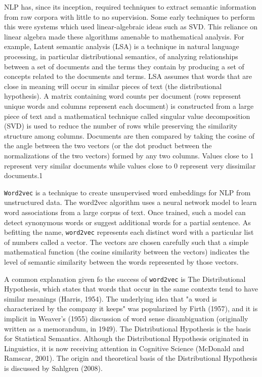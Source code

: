\documentclass[11pt]{book}
\begin{document}
NLP has, since its inception, required techniques to extract semantic information from raw corpora with little to no supervision. Some early techniques to perform this were systems which used linear-algebraic ideas such as SVD. This reliance on linear algebra made these algorithms amenable to mathematical analysis. For example, 
Latent semantic analysis (LSA) is a technique in natural language processing, in particular distributional semantics, of analyzing relationships between a set of documents and the terms they contain by producing a set of concepts related to the documents and terms. LSA assumes that words that are close in meaning will occur in similar pieces of text (the distributional hypothesis). A matrix containing word counts per document (rows represent unique words and columns represent each document) is constructed from a large piece of text and a mathematical technique called singular value decomposition (SVD) is used to reduce the number of rows while preserving the similarity structure among columns. Documents are then compared by taking the cosine of the angle between the two vectors (or the dot product between the normalizations of the two vectors) formed by any two columns. Values close to 1 represent very similar documents while values close to 0 represent very dissimilar documents.1



\texttt{Word2vec} is a technique to create unsupervised word embeddings for NLP from unstructured data. The word2vec algorithm uses a neural network model to learn word associations from a large corpus of text. Once trained, such a model can detect synonymous words or suggest additional words for a partial sentence. As befitting the name, \texttt{word2vec} represents each distinct word with a particular list of numbers called a vector. The vectors are chosen carefully such that a simple mathematical function (the cosine similarity between the vectors) indicates the level of semantic similarity between the words represented by those vectors.

A common explanation given fo the success of \texttt{word2vec} is The Distributional Hypothesis, which states that words that occur in the same contexts tend to have similar meanings (Harris, 1954). The underlying idea that "a word is characterized by the company it keeps" was popularized by Firth (1957), and it is implicit in Weaver's (1955) discussion of word sense disambiguation (originally written as a memorandum, in 1949). The Distributional Hypothesis is the basis for Statistical Semantics. Although the Distributional Hypothesis originated in Linguistics, it is now receiving attention in Cognitive Science (McDonald and Ramscar, 2001). The origin and theoretical basis of the Distributional Hypothesis is discussed by Sahlgren (2008).
\end{document}
